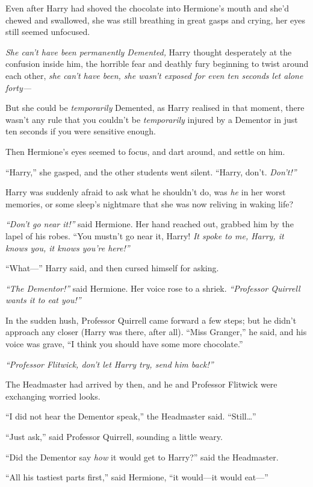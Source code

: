 Even after Harry had shoved the chocolate into Hermione's mouth and
she'd chewed and swallowed, she was still breathing in great gasps and
crying, her eyes still seemed unfocused.

\emph{She can't have been permanently Demented,} Harry thought
desperately at the confusion inside him, the horrible fear and deathly
fury beginning to twist around each other, \emph{she can't have been,
she wasn't exposed for even ten seconds let alone forty---}

But she could be \emph{temporarily} Demented, as Harry realised in that
moment, there wasn't any rule that you couldn't be \emph{temporarily}
injured by a Dementor in just ten seconds if you were sensitive enough.

Then Hermione's eyes seemed to focus, and dart around, and settle on
him.

``Harry,'' she gasped, and the other students went silent. ``Harry,
don't. \emph{Don't!''}

Harry was suddenly afraid to ask what he shouldn't do, was \emph{he} in
her worst memories, or some sleep's nightmare that she was now reliving
in waking life?

\emph{``Don't go near it!''} said Hermione. Her hand reached out,
grabbed him by the lapel of his robes. ``You mustn't go near it, Harry!
\emph{It spoke to me, Harry, it knows you, it knows you're here!''}

``What---'' Harry said, and then cursed himself for asking.

\emph{``The Dementor!''} said Hermione. Her voice rose to a shriek.
\emph{``Professor Quirrell wants it to eat you!''}

In the sudden hush, Professor Quirrell came forward a few steps; but he
didn't approach any closer (Harry was there, after all). ``Miss
Granger,'' he said, and his voice was grave, ``I think you should have
some more chocolate.''

\emph{``Professor Flitwick, don't let Harry try, send him back!''}

The Headmaster had arrived by then, and he and Professor Flitwick were
exchanging worried looks.

``I did not hear the Dementor speak,'' the Headmaster said.
``Still\ldots{}''

``Just ask,'' said Professor Quirrell, sounding a little weary.

``Did the Dementor say \emph{how} it would get to Harry?'' said the
Headmaster.

``All his tastiest parts first,'' said Hermione, ``it would---it would
eat---''

